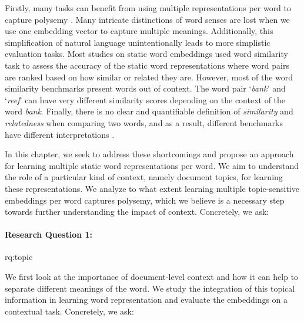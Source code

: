 Firstly, many tasks can benefit from using multiple representations per word to capture polysemy \citep{Bengio:2003,reisinger-mooney:2010:NAACLHLT}.
Many intricate distinctions of word senses are lost when we use one embedding vector to capture multiple meanings.
Additionally, this simplification of natural language unintentionally leads to more simplistic evaluation tasks.  
Most studies on static word embeddings used word similarity task to assess the accuracy of the static word representations where word pairs are ranked based on how similar or related they are.
However, most of the word similarity benchmarks present words out of context. The word pair `\textit{bank}' and `\textit{reef}' can have very different similarity scores depending on the context of the word \textit{bank}.
Finally, there is no clear and quantifiable definition of \textit{similarity} and \textit{relatedness} when comparing two words, and as a result, different benchmarks have different interpretations \citep{faruqui2016problems}. 

In this chapter, we seek to address these shortcomings and propose an approach for learning multiple static word representations per word.
We aim to understand the role of a particular kind of context, namely document topics, for learning these representations.
We analyze to what extent learning multiple topic-sensitive embeddings per word captures polysemy, which we believe is a necessary step towards further understanding the impact of context. 
Concretely, we ask: 


\paragraph{Research Question 1:} \acl{rq:topic} 

\medskip

 \noindent We first look at the importance of document-level context and how it can help to separate different meanings of the word.
We study the integration of this topical information in learning word representation and evaluate the embeddings on a contextual task. 
Concretely, we ask: 
 
